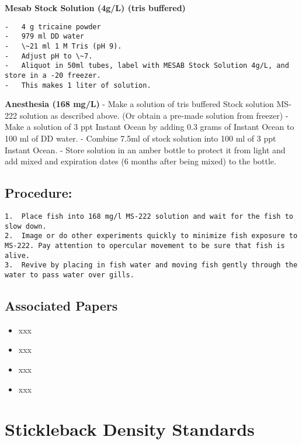 \documentclass[
  letterpaper,
  DIV=11,
  numbers=noendperiod]{scrreprt}
\providecommand{\tightlist}{%
  \setlength{\itemsep}{0pt}\setlength{\parskip}{0pt}}\usepackage{longtable,booktabs,array}
\begin{document}
\textbf{Mesab Stock Solution (4g/L) (tris buffered)}

\begin{verbatim}
-   4 g tricaine powder
-   979 ml DD water
-   \~21 ml 1 M Tris (pH 9).
-   Adjust pH to \~7.
-   Aliquot in 50ml tubes, label with MESAB Stock Solution 4g/L, and store in a -20 freezer.
-   This makes 1 liter of solution.
\end{verbatim}

\textbf{Anesthesia (168 mg/L)} - Make a solution of tris buffered Stock
solution MS-222 solution as described above. (Or obtain a pre-made
solution from freezer) - Make a solution of 3 ppt Instant Ocean by
adding 0.3 grams of Instant Ocean to 100 ml of DD water. - Combine 7.5ml
of stock solution into 100 ml of 3 ppt Instant Ocean. - Store solution
in an amber bottle to protect it from light and add mixed and expiration
dates (6 months after being mixed) to the bottle.

\hypertarget{procedure-25}{%
\section{Procedure:}\label{procedure-25}}

\begin{verbatim}
1.  Place fish into 168 mg/l MS-222 solution and wait for the fish to slow down.
2.  Image or do other experiments quickly to minimize fish exposure to MS-222. Pay attention to opercular movement to be sure that fish is alive.
3.  Revive by placing in fish water and moving fish gently through the water to pass water over gills.
\end{verbatim}

\hypertarget{associated-papers-16}{%
\section{Associated Papers}\label{associated-papers-16}}

\begin{itemize}
\tightlist
\item
  xxx
\item
  xxx
\item
  xxx
\item
  xxx
\end{itemize}

\hypertarget{sec-husb-stickle_density}{%
\chapter{Stickleback Density Standards}\label{sec-husb-stickle_density}}
\end{document}
